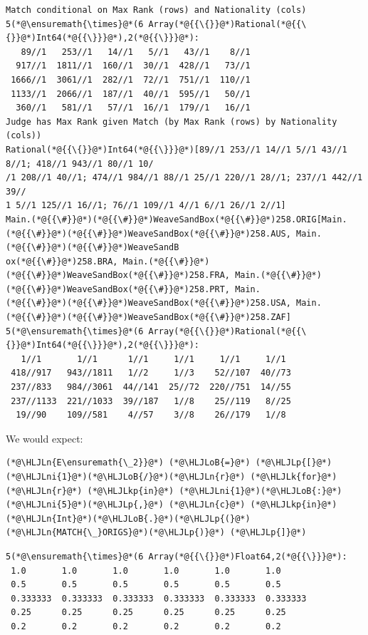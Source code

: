 \documentclass[12pt,a4paper]{article}
\newcommand{\HLJLk}[1]{\textcolor[RGB]{148,91,176}{\textbf{#1}}}
\newcommand{\HLJLkp}[1]{\textcolor[RGB]{148,91,176}{\textbf{#1}}}
\newcommand{\HLJLn}[1]{#1}
\newcommand{\HLJLni}[1]{\textcolor[RGB]{59,151,46}{#1}}
\newcommand{\HLJLoB}[1]{\textcolor[RGB]{102,102,102}{\textbf{#1}}}
\newcommand{\HLJLp}[1]{#1}
\begin{document}
\begin{lstlisting}
Match conditional on Max Rank (rows) and Nationality (cols)
5(*@\ensuremath{\times}@*(6 Array(*@{{\{}}@*)Rational(*@{{\{}}@*)Int64(*@{{\}}}@*),2(*@{{\}}}@*):
   89//1   253//1   14//1   5//1   43//1    8//1
  917//1  1811//1  160//1  30//1  428//1   73//1
 1666//1  3061//1  282//1  72//1  751//1  110//1
 1133//1  2066//1  187//1  40//1  595//1   50//1
  360//1   581//1   57//1  16//1  179//1   16//1
Judge has Max Rank given Match (by Max Rank (rows) by Nationality (cols))
Rational(*@{{\{}}@*)Int64(*@{{\}}}@*)[89//1 253//1 14//1 5//1 43//1 8//1; 418//1 943//1 80//1 10/
/1 208//1 40//1; 474//1 984//1 88//1 25//1 220//1 28//1; 237//1 442//1 39//
1 5//1 125//1 16//1; 76//1 109//1 4//1 6//1 26//1 2//1]
Main.(*@{{\#}}@*)(*@{{\#}}@*)WeaveSandBox(*@{{\#}}@*)258.ORIG[Main.(*@{{\#}}@*)(*@{{\#}}@*)WeaveSandBox(*@{{\#}}@*)258.AUS, Main.(*@{{\#}}@*)(*@{{\#}}@*)WeaveSandB
ox(*@{{\#}}@*)258.BRA, Main.(*@{{\#}}@*)(*@{{\#}}@*)WeaveSandBox(*@{{\#}}@*)258.FRA, Main.(*@{{\#}}@*)(*@{{\#}}@*)WeaveSandBox(*@{{\#}}@*)258.PRT, Main.
(*@{{\#}}@*)(*@{{\#}}@*)WeaveSandBox(*@{{\#}}@*)258.USA, Main.(*@{{\#}}@*)(*@{{\#}}@*)WeaveSandBox(*@{{\#}}@*)258.ZAF]
5(*@\ensuremath{\times}@*(6 Array(*@{{\{}}@*)Rational(*@{{\{}}@*)Int64(*@{{\}}}@*),2(*@{{\}}}@*):
   1//1       1//1      1//1     1//1     1//1     1//1
 418//917   943//1811   1//2     1//3    52//107  40//73
 237//833   984//3061  44//141  25//72  220//751  14//55
 237//1133  221//1033  39//187   1//8    25//119   8//25
  19//90    109//581    4//57    3//8    26//179   1//8
\end{lstlisting}


We would expect:


\begin{lstlisting}
(*@\HLJLn{E\ensuremath{\_2}}@*) (*@\HLJLoB{=}@*) (*@\HLJLp{[}@*) (*@\HLJLni{1}@*)(*@\HLJLoB{/}@*)(*@\HLJLn{r}@*) (*@\HLJLk{for}@*) (*@\HLJLn{r}@*) (*@\HLJLkp{in}@*) (*@\HLJLni{1}@*)(*@\HLJLoB{:}@*)(*@\HLJLni{5}@*)(*@\HLJLp{,}@*) (*@\HLJLn{c}@*) (*@\HLJLkp{in}@*) (*@\HLJLn{Int}@*)(*@\HLJLoB{.}@*)(*@\HLJLp{(}@*)(*@\HLJLn{MATCH{\_}ORIGS}@*)(*@\HLJLp{)}@*) (*@\HLJLp{]}@*)
\end{lstlisting}

\begin{lstlisting}
5(*@\ensuremath{\times}@*(6 Array(*@{{\{}}@*)Float64,2(*@{{\}}}@*):
 1.0       1.0       1.0       1.0       1.0       1.0
 0.5       0.5       0.5       0.5       0.5       0.5
 0.333333  0.333333  0.333333  0.333333  0.333333  0.333333
 0.25      0.25      0.25      0.25      0.25      0.25
 0.2       0.2       0.2       0.2       0.2       0.2
\end{lstlisting}
\end{document}

